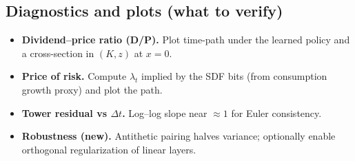 ﻿\documentclass[11pt,letterpaper,oneside]{article}
\numberwithin{equation}{section}
\newcommand{\1}{\mathbf{1}}
\begin{document}
\subsection*{Diagnostics and plots (what to verify)}
\begin{tcolorbox}[didacticstyle]
\begin{itemize}[leftmargin=1.1em,itemsep=0.25em]
  \item \textbf{Dividend–price ratio (D/P).} Plot time-path under the learned policy and a cross-section in $(K,z)$ at $x=0$.
  \item \textbf{Price of risk.} Compute $\lambda_t$ implied by the SDF bits (from consumption growth proxy) and plot the path.
  \item \textbf{Tower residual vs $\Delta t$.} Log–log slope near $\approx 1$ for Euler consistency.
  \item \textbf{Robustness (new).} Antithetic pairing halves variance; optionally enable orthogonal regularization of linear layers.
\end{itemize}
\end{tcolorbox}
\end{document}
